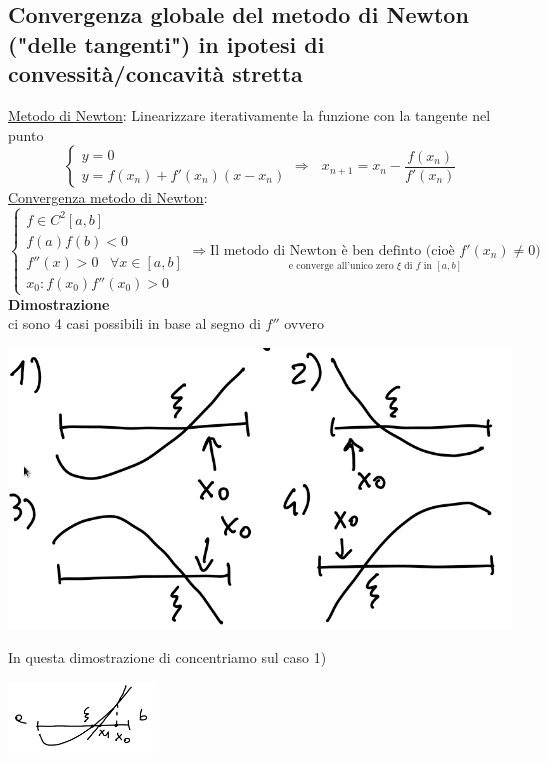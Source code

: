 \subsection{Convergenza globale del metodo di Newton ("delle tangenti") in ipotesi di convessità/concavità stretta}
\underline{Metodo di Newton}: Linearizzare iterativamente la funzione con la tangente nel punto
\[
\begin{cases}
	y = 0 \\
	y = f(x_n) + f'(x_n)(x-x_n) 
\end{cases}
\Rightarrow \,\,\,\,x_{n+1} = x_n - \frac{f(x_n)}{f'(x_n)}
\]
\underline{Convergenza metodo di Newton}:\\
\[
\begin{cases}
	f\in C^2[a,b]\\
	f(a)f(b)<0\\
	f''(x)>0 \,\,\,\,\, \forall x\in [a,b]\\
	x_0 : f(x_0)f''(x_0)>0
\end{cases}
\Rightarrow \underset{\text{e converge all'unico zero $\xi$ di $f$ in $[a,b]$}}{\text{Il metodo di Newton è ben definto (cioè $f'(x_n)\ne 0$)}}
\]
\textbf{Dimostrazione}\\
ci sono 4 casi possibili in base al segno di $f''$ ovvero
\begin{center}
	\includegraphics[scale=0.35]{pagina11_1.png}
\end{center}
In questa dimostrazione di concentriamo sul caso 1)\\
\begin{center}
	\includegraphics[width=0.3\textwidth]{pagina12_2.PNG} 
\end{center}

